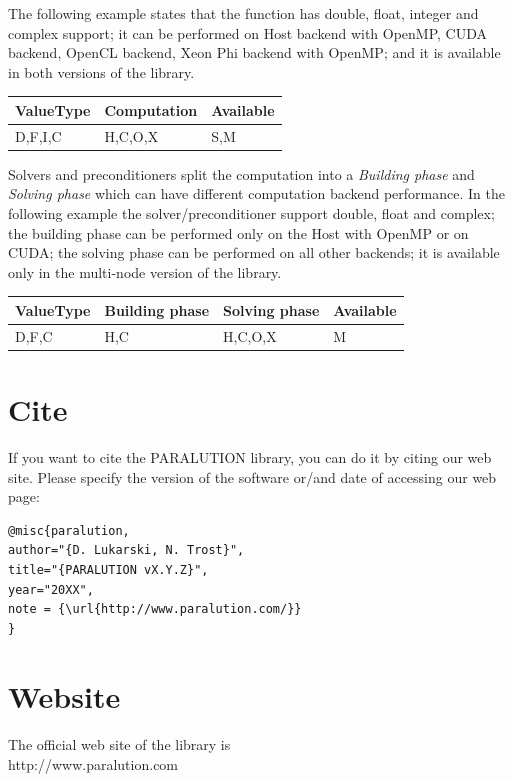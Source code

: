 The following example states that the function has double, float, integer and complex support; it can be performed on Host backend with OpenMP, CUDA backend, OpenCL backend, Xeon Phi backend with OpenMP; and it is available in both versions of the library.

\begin{table}[H]
\begin{tabular}{l|l|l}
\multicolumn{1}{c|}{ValueType} & Computation & Available \\ \hline
D,F,I,C                        & H,C,O,X     & S,M    
\end{tabular}
\end{table}

Solvers and preconditioners split the computation into a \emph{Building phase} and \emph{Solving phase} which can have different computation backend performance. In the following example the solver/preconditioner support double, float and complex; the building phase can be performed only on the Host with OpenMP or on CUDA; the solving phase can be performed on all other backends; it is available only in the multi-node version of the library.

\begin{table}[H]
\begin{tabular}{l|l|l|l}
\multicolumn{1}{c|}{ValueType} & Building phase & Solving phase & Available \\ \hline
D,F,C                          & H,C            & H,C,O,X       & M
\end{tabular}
\end{table}

\section{Cite}

If you want to cite the PARALUTION library, you can do it by citing our web site. Please specify the version of the software or/and date of accessing our web page:
\begin{lstlisting}
@misc{paralution,
author="{D. Lukarski, N. Trost}",
title="{PARALUTION vX.Y.Z}",
year="20XX",
note = {\url{http://www.paralution.com/}}
}
\end{lstlisting}

\section{Website}

The official web site of the library is
\\
http://www.paralution.com
